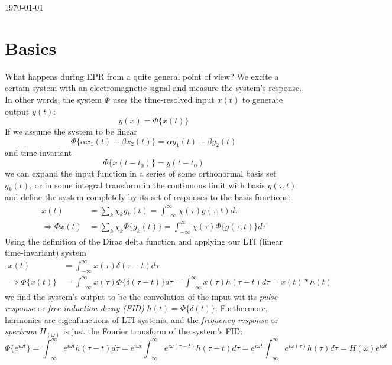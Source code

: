 \documentclass[11.5pt,a4paper]{article}
\begin{document}

\newpage
\tableofcontents

\vfill
\hfill \today 


\newpage

\section{Basics}
What happens during EPR from a quite general point of view? We excite a certain system with an electromagnetic signal and measure the system's response. In other words, the system $\Phi$ uses the time-resolved input $x(t)$ to generate output $y(t)$:
\begin{equation}
	y(x) = \Phi\{x(t)\}
\end{equation}
If we assume the system to be linear
\begin{equation}
 	\Phi\{\alpha x_1(t) + \beta x_2(t)\} = \alpha y_1(t) + \beta y_2(t)
\end{equation}
and time-invariant
\begin{equation}
	\Phi\{x(t-t_0)\} = y(t-t_0)
\end{equation}
we can expand the input function in a series of some orthonormal basis set $g_k(t)$, or in some integral transform in the continuous limit with basis $g(\tau,t)$ and define the system completely by its set of responses to the basis functions:
\begin{align}
	x(t) & = \sum_k \chi_k g_k(t) = \int_{-\infty}^{\infty} \chi(\tau) g(\tau,t) d\tau \\
	\Rightarrow \Phi{x(t)} & = \sum_k \chi_k \Phi\{g_k(t)\} = \int_{-\infty}^{\infty} \chi(\tau) \Phi\{g(\tau,t)\} d\tau
\end{align}
Using the definition of the Dirac delta function and applying our LTI (linear time-invariant) system
\begin{align}
	x(t) & =  \int_{-\infty}^{\infty} x(\tau) \delta(\tau-t) d\tau \\
	\Rightarrow 	\Phi\{x(t)\} & =  \int_{-\infty}^{\infty} x(\tau) \Phi\{\delta(\tau-t)\} d\tau = \int_{-\infty}^{\infty} x(\tau) h(\tau-t) d\tau = x(t) * h(t)
\end{align}
we find the system's output to be the convolution of the input wit its \emph{pulse response} or \emph{free induction decay (FID)} $h(t) = \Phi\{\delta(t)\}$. 
Furthermore, harmonics are eigenfunctions of LTI systems, and the \emph{frequency response} or \emph{spectrum} $H_(\omega)$ is just the Fourier transform of the system's FID:
\begin{equation}
	\Phi\{e^{i\omega t}\} = \int_{-\infty}^{\infty} e^{i\omega t} h(\tau-t) d\tau =  e^{i\omega t} \int_{-\infty}^{\infty} e^{i\omega (\tau-t)} h(\tau-t) d\tau =  e^{i\omega t} \int_{-\infty}^{\infty} e^{i\omega (\tau)} h(\tau) d\tau = H(\omega) e^{i \omega t}
\end{equation}
\end{document}
